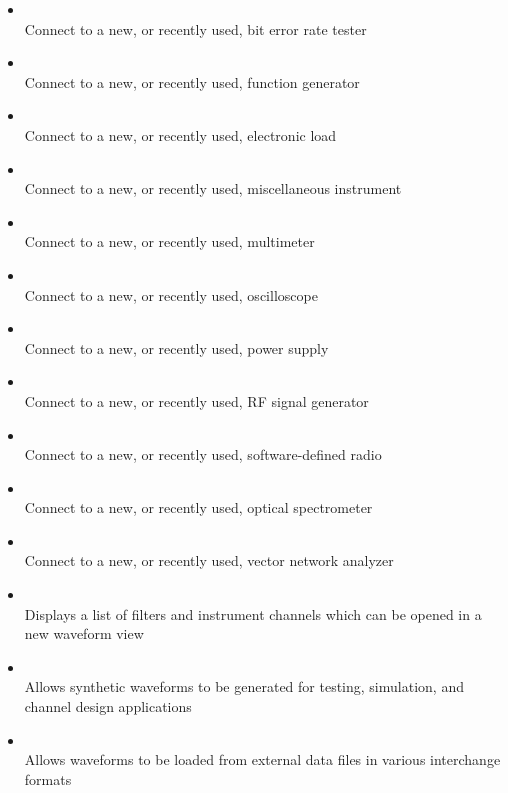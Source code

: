 \begin{itemize}

\item {}\\
Connect to a new, or recently used, bit error rate tester

\item {}\\
Connect to a new, or recently used, function generator

\item {}\\
Connect to a new, or recently used, electronic load

\item {}\\
Connect to a new, or recently used, miscellaneous instrument

\item {}\\
Connect to a new, or recently used, multimeter

\item {}\\
Connect to a new, or recently used, oscilloscope

\item {}\\
Connect to a new, or recently used, power supply

\item {}\\
Connect to a new, or recently used, RF signal generator

\item {}\\
Connect to a new, or recently used, software-defined radio

\item {}\\
Connect to a new, or recently used, optical spectrometer

\item {}\\
Connect to a new, or recently used, vector network analyzer

\item {}\\
Displays a list of filters and instrument channels which can be opened in a new waveform view

\item {}\\
Allows synthetic waveforms to be generated for testing, simulation, and channel design applications

\item {}\\
Allows waveforms to be loaded from external data files in various interchange formats

\end{itemize}

